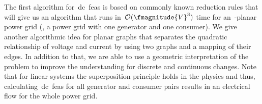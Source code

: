 The first algorithm for~\gls{dc}~\gls{feas} is based on commonly known reduction
rules that will give us an algorithm that runs
in~$\bigO(\fmagnitude{\vertices}^3)$ time for an~\source-\sink planar power grid
(\ie, a power grid with one generator and one consumer). We give another
algorithmic idea for planar graphs that separates the quadratic relationship of
voltage and current by using two graphs and a mapping of their edges. In
addition to that, we are able to use a geometric interpretation of the problem
to improve the understanding for discrete and continuous changes. Note that for
linear systems the superposition principle holds in the physics and thus,
calculating~\gls{dc}~\gls{feas} for all generator and consumer pairs results in
an electrical flow for the whole power grid.
% 
%
